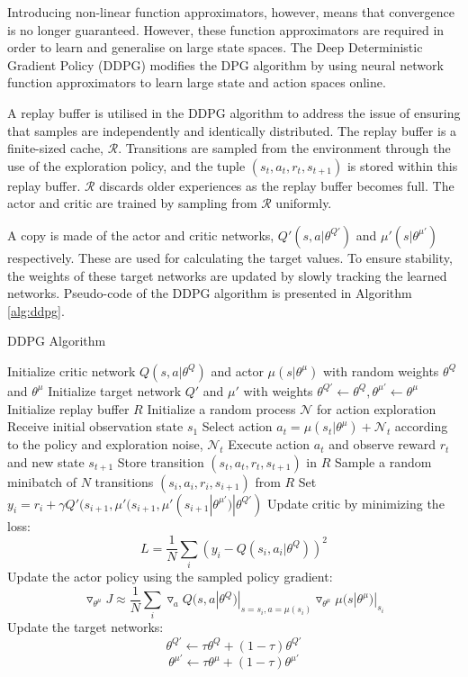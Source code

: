 Introducing non-linear function approximators, however, means that convergence is no longer guaranteed. However, these function approximators are required in order to learn and generalise on large state spaces. The Deep Deterministic Gradient Policy (DDPG) modifies the DPG algorithm by using neural network function approximators to learn large state and action spaces online.

A replay buffer is utilised in the DDPG algorithm to address the issue of ensuring that samples are independently and identically distributed. The replay buffer is a finite-sized cache, $\mathcal{R}$. Transitions are sampled from the environment through the use of the exploration policy, and the tuple $(s_t,a_t,r_t,s_{t+1})$ is stored within this replay buffer. $\mathcal{R}$ discards older experiences as the replay buffer becomes full. The actor and critic are trained by sampling from $\mathcal{R}$ uniformly. 

A copy is made of the actor and critic networks, $Q'(s,a|\theta^{Q'})$ and $\mu'(s|\theta^{\mu'})$ respectively. These are used for calculating the target values. To ensure stability, the weights of these target networks are updated by slowly tracking the learned networks. Pseudo-code of the DDPG algorithm is presented in Algorithm \ref{alg:ddpg}.

\begin{algorithm}
	\caption{DDPG Algorithm \cite{Hunt2016a}}
	\begin{algorithmic}[1]
		\small
		\State Initialize critic network $Q(s,a|\theta^Q)$ and actor $\mu(s|\theta^\mu)$ with random weights $\theta^Q$ and $\theta^\mu$
		\State Initialize target network $Q'$ and $\mu'$ with weights $\theta^{Q'}\leftarrow\theta^Q,\theta^{\mu'}\leftarrow \theta^{\mu}$
		\State Initialize replay buffer $R$
		\State Initialize a random process $\mathcal{N}$ for action exploration
		\State Receive initial observation state $s_1$
		\State Select action $a_t=\mu(s_t|\theta^{\mu})+\mathcal{N}_t$ according to the policy and exploration noise, $\mathcal{N}_t$
		\State Execute action $a_t$ and observe reward $r_t$ and new state $s_{t+1}$
		\State Store transition $(s_t, a_t, r_t, s_{t+1})$ in $R$
		\State Sample a random minibatch of $N$ transitions $(s_i, a_i, r_i, s_{i+1})$ from $R$
		\State Set $y_i=r_i+\gamma Q'(s_{i+1},\mu'(s_{i+1},\mu'(s_{i+1}|\theta^{\mu'})|\theta^{Q'})$
		\State Update critic by minimizing the loss: $$L=\frac{1}{N}\sum_i(y_i-Q(s_i,a_i|\theta^Q))^2$$
		\State Update the actor policy using the sampled policy gradient: $$\triangledown_{\theta^\mu}J\approx \frac{1}{N}\sum_i\triangledown_a Q(s,a|\theta^Q)|_{s=s_i,a=\mu(s_i)}\triangledown_{\theta^\mu}\mu(s|\theta^\mu)|_{s_i}$$
		\State Update the target networks:
		$$\theta^{Q'}\leftarrow\tau\theta^Q+(1-\tau)\theta^{Q'}$$
		$$\theta^{\mu'}\leftarrow\tau\theta^\mu+(1-\tau)\theta^{\mu'}$$
		\EndFor
		\EndFor
	\end{algorithmic}
	\label{alg:ddpg}
\end{algorithm}

